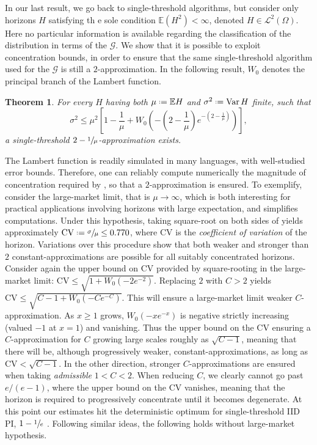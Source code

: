 \documentclass[11pt, a4paper, twoside]{article}
\newcommand*{\defeq}{\mathrel{\vcenter{\baselineskip0.5ex \lineskiplimit0pt
			\hbox{\scriptsize.}\hbox{\scriptsize.}}}=}
\newcommand{\EE}{\mathbb{E}}
\newcommand{\PGF}{\mathcal{G}}
\DeclareMathOperator{\Var}{Var}
\newtheorem{theorem}{Theorem}[section]
\numberwithin{equation}{section}
\begin{document}
	In our last result, we go back to single-threshold algorithms, but consider only horizons $H$ satisfying th e sole condition $\EE( H^2)<\infty$, denoted $H\in\mathcal{L}^2(\Omega)$. Here no particular information is available regarding the classification of the distribution in terms of the $\PGF$. We show that it is possible to exploit concentration bounds, in order to ensure that the same single-threshold algorithm used for the $\PGF$ is still a $2$-approximation. In the following result, $W_0$ denotes the principal branch of the Lambert function.
	\begin{theorem}\label{L2horizon}
		For every $H$ having both $\mu\defeq \EE H$ and $\sigma^2\defeq\Var H$ finite, such that
	\begin{equation}\label{concentration}
        \sigma^2\le\mu^2\left[ 1-\frac{1}{\mu}+W_0\left(-\left(2-\frac{1}{\mu}\right)e^{-\left(2-\frac{1}{\mu}\right)}\right)\right],
        \end{equation}
		a single-threshold $2-\sfrac{1}{\mu}$-approximation exists.
	\end{theorem}
	The Lambert function is readily simulated in many languages, with well-studied error bounds. Therefore, one can reliably compute numerically the magnitude of concentration required by , so that a $2$-approximation is ensured. To exemplify, consider the large-market limit, that is $\mu\longrightarrow\infty$, which is both interesting for practical applications involving horizons with large expectation, and simplifies computations. Under this hypothesis, taking square-root on both sides of  yields approximately $\text{CV}\defeq\sfrac{\sigma}{\mu}\le0.770$, where $\text{CV}$ is the \textit{coefficient of variation} of the horizon. 
	Variations over this procedure show that both weaker and stronger than $2$ constant-approximations are possible for all suitably concentrated horizons. Consider again the upper bound on $\text{CV}$ provided by square-rooting  in the large-market limit: $\text{CV}\le \sqrt{1+W_0(-2e^{-2})}$. Replacing $2$ with $C>2$ yields $\text{CV}\le \sqrt{C-1+W_0(-Ce^{-C})}$. This will ensure a large-market limit weaker $C$-approximation. As $x\ge1$ grows, $W_0(-xe^{-x})$ is negative strictly increasing (valued $-1$ at $x=1$) and vanishing. Thus the upper bound on the $\text{CV}$ ensuring a $C$-approximation for $C$ growing large scales roughly as $\sqrt{C-1}$, meaning that there will be, although progressively weaker, constant-approximations, as long as $\text{CV}<\sqrt{C-1}$.
	In the other direction, stronger $C$-approximations are ensured when taking \textit{admissible} $1<C<2$. When reducing $C$, we clearly cannot go past $e/(e-1)$, where the upper bound on the $\text{CV}$ vanishes, meaning that the horizon is required to progressively concentrate until it becomes degenerate. At this point our estimates hit the deterministic optimum for single-threshold IID PI, $1-\sfrac{1}{e}$ \cite{Esh18}. Following similar ideas, the following holds without large-market hypothesis.
\end{document}
